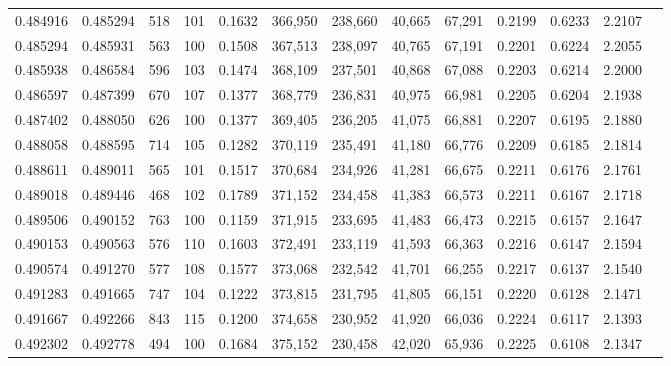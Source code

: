 \begin{tabular}{rrrrrrrrrrrrr}
0.484916 & 0.485294 &    518 &   101 &                                     0.1632 & 366,950 & 238,660 &  40,665 &  67,291 & 0.2199 & 0.6233 & 2.2107 \\
0.485294 & 0.485931 &    563 &   100 &                                     0.1508 & 367,513 & 238,097 &  40,765 &  67,191 & 0.2201 & 0.6224 & 2.2055 \\
0.485938 & 0.486584 &    596 &   103 &                                     0.1474 & 368,109 & 237,501 &  40,868 &  67,088 & 0.2203 & 0.6214 & 2.2000 \\
0.486597 & 0.487399 &    670 &   107 &                                     0.1377 & 368,779 & 236,831 &  40,975 &  66,981 & 0.2205 & 0.6204 & 2.1938 \\
0.487402 & 0.488050 &    626 &   100 &                                     0.1377 & 369,405 & 236,205 &  41,075 &  66,881 & 0.2207 & 0.6195 & 2.1880 \\
0.488058 & 0.488595 &    714 &   105 &                                     0.1282 & 370,119 & 235,491 &  41,180 &  66,776 & 0.2209 & 0.6185 & 2.1814 \\
0.488611 & 0.489011 &    565 &   101 &                                     0.1517 & 370,684 & 234,926 &  41,281 &  66,675 & 0.2211 & 0.6176 & 2.1761 \\
0.489018 & 0.489446 &    468 &   102 &                                     0.1789 & 371,152 & 234,458 &  41,383 &  66,573 & 0.2211 & 0.6167 & 2.1718 \\
0.489506 & 0.490152 &    763 &   100 &                                     0.1159 & 371,915 & 233,695 &  41,483 &  66,473 & 0.2215 & 0.6157 & 2.1647 \\
0.490153 & 0.490563 &    576 &   110 &                                     0.1603 & 372,491 & 233,119 &  41,593 &  66,363 & 0.2216 & 0.6147 & 2.1594 \\
0.490574 & 0.491270 &    577 &   108 &                                     0.1577 & 373,068 & 232,542 &  41,701 &  66,255 & 0.2217 & 0.6137 & 2.1540 \\
0.491283 & 0.491665 &    747 &   104 &                                     0.1222 & 373,815 & 231,795 &  41,805 &  66,151 & 0.2220 & 0.6128 & 2.1471 \\
0.491667 & 0.492266 &    843 &   115 &                                     0.1200 & 374,658 & 230,952 &  41,920 &  66,036 & 0.2224 & 0.6117 & 2.1393 \\
0.492302 & 0.492778 &    494 &   100 &                                     0.1684 & 375,152 & 230,458 &  42,020 &  65,936 & 0.2225 & 0.6108 & 2.1347 \\

\end{tabular}
